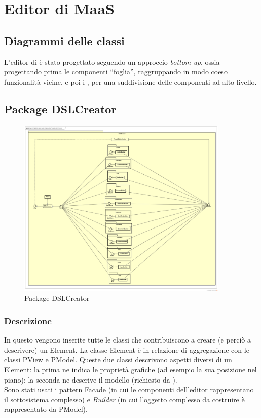 \section{Editor di MaaS}
        \subsection{Diagrammi delle classi}
        L'editor di  è stato progettato seguendo un approccio \textit{bottom-up}, ossia progettando prima le componenti ``foglia'', raggruppando in modo coeso funzionalità vicine, e poi i , per una suddivisione delle componenti ad alto livello.
        \subsection{Package DSLCreator}
        \begin{figure}[H]
          \centering
          \includegraphics[width=0.9\textwidth]{res/img/diagram_facade.png}
          \caption{Package DSLCreator}
          \label{fig:diagram_model}
        \end{figure}
        \subsubsection{Descrizione}
        In questo  vengono inserite tutte le classi che contribuiscono a creare (e perciò a descrivere) un  Element. La classe  Element è in relazione di aggregazione con le classi PView e PModel. Queste due classi descrivono aspetti diversi di un  Element: la prima ne indica le proprietà grafiche (ad esempio la sua posizione nel piano); la seconda ne descrive il modello (richiesto da ).\\
        Sono stati usati i pattern Facade (in cui le componenti dell'editor rappresentano il sottosistema complesso) e \textit{Builder} (in cui l'oggetto complesso da costruire è rappresentato da PModel).

